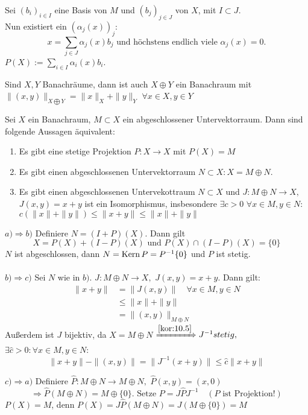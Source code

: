 \begin{beweis}
	Sei $(b_{i})_{i \in I}$ eine Basis von $M$ und $(b_{j})_{j \in J}$ von $X$, mit $I \subset J$. \\
	Nun existiert ein $(\alpha_{j}(x))_{j}$:
	\[ x = \sum_{j \in J} \alpha_{j}(x) b_{j} \text{ und höchstens endlich viele } \alpha_{j}(x) = 0. \]
	$P(X) := \sum_{i \in I} \alpha_{i}(x) b_{i}$.
\end{beweis}


\begin{erinnerung}
	Sind $X, Y$ Banachräume, dann ist auch $X \oplus Y$ ein Banachraum mit $\| (x, y) \|_{X \bigoplus Y} = \| x \|_{X} + \| y \|_{Y}$ $\forall x \in X, y \in Y$
\end{erinnerung}


\begin{satz} \label{satz:11.4}
	Sei $X$ ein Banachraum, $M \subset X$ ein abgeschlossener Untervektorraum. Dann sind folgende Aussagen äquivalent:
	\begin{enumerate}[label=\alph*\upshape)]
		\item Es gibt eine stetige Projektion $P: X \rightarrow X$ mit $P(X) = M$
		\item Es gibt einen abgeschlossenen Untervektorraum $N \subset X: X = M \oplus N$.
		\item Es gibt einen abgeschlossenen Untervekottraum $N \subset X$ und $J: M \oplus N \rightarrow X,$ $J(x, y) = x + y$ ist ein Isomorphismus, insbesondere $\exists c > 0$ $\forall x \in M, y \in N:$ $c \left( \|x \| + \|y \| \right) \leq \|x + y \| \leq \|x \| + \| y \| $
	\end{enumerate}
\end{satz}

\begin{beweis}
	$a) \Rightarrow b)$ Definiere $N = (I + P)(X)$. Dann gilt
		\[ X = P(X) + (I - P)(X) \text{ und } P(X) \cap (I - P)(X) = \{ 0 \} \]
		$N$ ist abgeschlossen, dann $N = \mathop{\rm Kern}\nolimits{P} = P^{-1}\{ 0 \}$ und $P$ ist stetig.	\\ \\
	$b) \Rightarrow c)$ Sei $N$ wie in $b)$. $J: M \oplus N \rightarrow X,$ $J(x, y) = x + y$. Dann gilt:
		\begin{align*}
			\| x + y \| & = \| J(x, y) \| \quad \forall x \in M, y \in N \\
						& \leq \| x \| + \| y \| \\
						& = \| (x, y) \|_{M \oplus N}
		\end{align*}
		Au{\ss}erdem ist $J$ bijektiv, da $X = M \oplus N$
		$\xRightarrow[]{\ref{kor:10.5}} J^{-1} stetig,$ $\exists \hat{c} > 0: \forall x \in M, y \in N$:
		\[ \| x + y \| - \| (x, y) \| = \| J^{-1}(x + y) \| \leq \hat{c} \| x + y \| \]

	$c) \Rightarrow a)$ Definiere $\hat{P}: M \oplus N \rightarrow M \oplus N,$ $\hat{P}(x, y) = (x, 0)$
		\[ \Rightarrow \hat{P}(M \oplus N) = M \oplus \{ 0 \}. \text{ Setze } P = J \hat{P} J^{-1} \quad (P \text{ ist Projektion!}) \]
		$P(X) = M$, denn $P(X) = J \hat{P}(M \oplus N) = J (M \oplus \{ 0 \}) = M$
\end{beweis}


